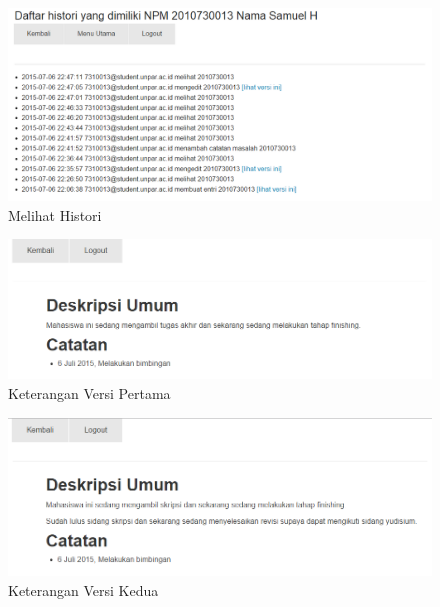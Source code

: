 \begin{figure}[H]
\centering
\includegraphics[scale=0.44]{Gambar/pengujian17.png}
\caption[Melihat Histori]{Melihat Histori} 
\label{fig:melihathistori}
\end{figure}

\begin{figure}[H]
\centering
\includegraphics[scale=0.44]{Gambar/pengujian18.png}
\caption[Keterangan Versi Pertama]{Keterangan Versi Pertama} 
\label{fig:keteranganpertama}
\end{figure}

\begin{figure}[H]
\centering
\includegraphics[scale=0.44]{Gambar/pengujian19.png}
\caption[Keterangan Versi Kedua]{Keterangan Versi Kedua} 
\label{fig:keterangankedua}
\end{figure}

